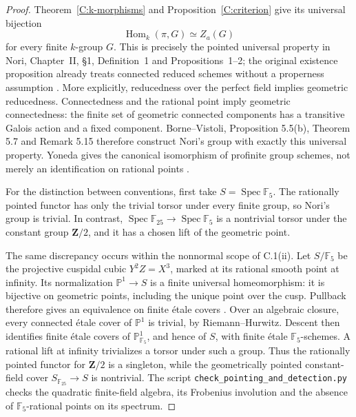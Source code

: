 \begin{proof}
Theorem~\ref{C:k-morphisms} and Proposition~\ref{C:criterion} give its
universal bijection
\[
\operatorname{Hom}_k(\pi,G)\simeq Z_a(G)
\]
for every finite $k$-group $G$.  This is precisely the pointed universal
property in Nori, Chapter~II, \S1, Definition~1 and Propositions~1--2;
the original existence proposition already treats connected reduced
schemes without a properness assumption
\cite[Chapter~II, \S1, pp.~85--87]{C_Nori1982}.
More explicitly, reducedness over
the perfect field implies geometric reducedness.  Connectedness and
the rational point imply geometric connectedness: the finite set of
geometric connected components has a transitive Galois action and a
fixed component.  Borne--Vistoli, Proposition 5.5(b), Theorem 5.7 and
Remark 5.15 therefore construct Nori's group with exactly this
universal property.  Yoneda gives the canonical isomorphism of
profinite group schemes, not merely an identification on rational
points \cite[Proposition~5.5(b), Theorem~5.7, Remark~5.15]{C_BorneVistoli2015}.

For the distinction between conventions, first take
$S=\operatorname{Spec}\mathbb F_5$.  The rationally pointed functor
has only the trivial torsor under every finite group, so Nori's group
is trivial.  In contrast,
$\operatorname{Spec}\mathbb F_{25}\to\operatorname{Spec}\mathbb F_5$
is a nontrivial torsor under the constant group $\mathbf Z/2$, and
it has a chosen lift of the geometric point.

The same discrepancy occurs within the nonnormal scope of C.1(ii).
Let $S/\mathbb F_5$ be the projective cuspidal cubic $Y^2Z=X^3$,
marked at its rational smooth point at infinity.  Its normalization
$\mathbb P^1\to S$ is a finite universal homeomorphism: it is
bijective on geometric points, including the unique point over the
cusp.  Pullback therefore gives an equivalence on finite \'etale
covers \cite[Theorem~59.45.2, tag 04DZ]{C_StacksLimits}.
Over an algebraic closure, every connected \'etale cover of
$\mathbb P^1$ is trivial, by Riemann--Hurwitz.  Descent then identifies
finite \'etale covers of $\mathbb P^1_{\mathbb F_5}$, and hence of $S$,
with finite \'etale $\mathbb F_5$-schemes.  A rational lift at infinity
trivializes a torsor under such a group.  Thus the rationally pointed
functor for $\mathbf Z/2$ is a singleton, while the geometrically
pointed constant-field cover $S_{\mathbb F_{25}}\to S$ is nontrivial.
The script \texttt{check\_pointing\_and\_detection.py} checks the quadratic
finite-field algebra, its Frobenius involution and the absence of
$\mathbb F_5$-rational points on its spectrum.
\end{proof}

